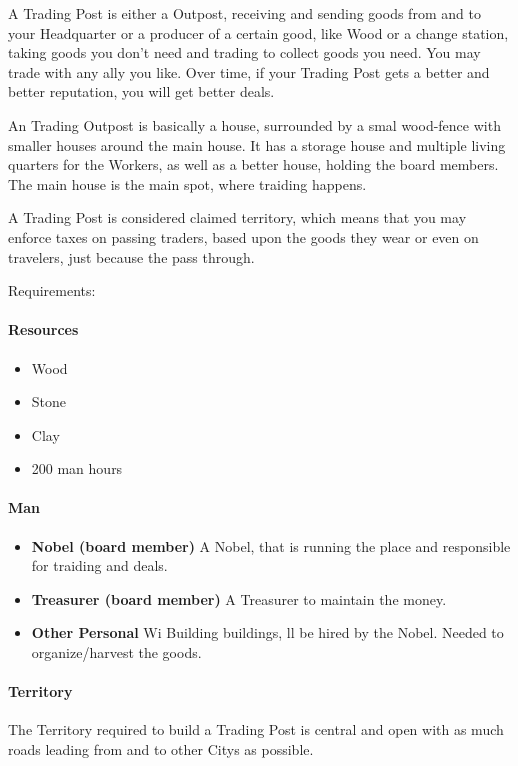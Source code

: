 A Trading Post is either a Outpost, receiving and sending goods from and to your Headquarter or a producer of a certain good, like Wood or a change station, taking goods you don't need and trading to collect goods you need. You may trade with any ally you like. Over time, if your Trading Post gets a better and better reputation, you will get better deals.

An Trading Outpost is basically a house, surrounded by a smal wood-fence with smaller houses around the main house. It has a storage house and multiple living quarters for the Workers, as well as a better house, holding the board members. The main house is the main spot, where traiding happens.

A Trading Post is considered claimed territory, which means that you may enforce taxes on passing traders, based upon the goods they wear or even on travelers, just because the pass through.

Requirements:

\paragraph{Resources}
\begin{itemize}
\item Wood
\item Stone
\item Clay
\item 200 man hours
\end{itemize}

\paragraph{Man}
\begin{itemize}
\item \textbf{Nobel (board member)} A Nobel, that is running the place and responsible for traiding and deals.
\item \textbf{Treasurer (board member)} A Treasurer to maintain the money.
\item \textbf{Other Personal} Wi Building buildings, ll be hired by the Nobel. Needed to organize/harvest the goods.
\end{itemize}

\paragraph{Territory}

The Territory required to build a Trading Post is central and open with as much roads leading from and to other Citys as possible.

